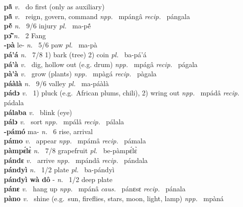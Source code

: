\noindent
{\bfseries pã̂}  {\itshape v.~} do first (only as auxiliary)    \\ 
{\bfseries pã̂}  {\itshape v.~} reign, govern, command   {\itshape npp.~} mpángâ {\itshape recip.~} pángala  \\ 
{\bfseries pẽ́}  {\itshape n.~} 9/6 injury {\itshape pl.~} ma-pẽ́    \\ 
{\bfseries pɔ̃̂}  {\itshape n.~} 2 Fang    \\ 
{\bfseries -pà} le- {\itshape n.~} 5/6 paw {\itshape pl.~} ma-pà    \\ 
{\bfseries pá'á}  {\itshape n.~} 7/8 1) bark (tree) 2) coin {\itshape pl.~} ba-pá'á    \\ 
{\bfseries pá'à}  {\itshape v.~} dig, hollow out (e.g. drum)   {\itshape npp.~} mpágâ {\itshape recip.~} págala  \\ 
{\bfseries pà'à}  {\itshape v.~} grow (plants)   {\itshape npp.~} mpàgá {\itshape recip.~} pàgala  \\ 
{\bfseries páàlà}  {\itshape n.~} 9/6 valley {\itshape pl.~} ma-páàlà    \\ 
{\bfseries pádɔ}  {\itshape v.~} 1) pluck (e.g.\ African plums, chili), 2) wring out   {\itshape npp.~} mpádâ {\itshape recip.~} pádala  \\ 
{\bfseries pálaba}  {\itshape v.~} blink (eye)    \\ 
{\bfseries pálɔ}  {\itshape v.~} sort   {\itshape npp.~} mpálâ {\itshape recip.~} pálala  \\ 
{\bfseries -pámó} ma- {\itshape n.~} 6 rise, arrival    \\ 
{\bfseries pámo}  {\itshape v.~} appear   {\itshape npp.~} mpámâ {\itshape recip.~} pámala  \\ 
{\bfseries pàmpɛ́lɛ̀}  {\itshape n.~} 7/8 grapefruit {\itshape pl.~} be-pàmpɛ́lɛ̀    \\ 
{\bfseries pándɛ}  {\itshape v.~} arrive   {\itshape npp.~} mpándâ {\itshape recip.~} pándala  \\ 
{\bfseries pándyì}  {\itshape n.~} 1/2 plate {\itshape pl.~} ba-pándyì    \\ 
{\bfseries pándyì wà dô} - {\itshape  n.~} 1/2 deep plate    \\ 
{\bfseries pánɛ}  {\itshape v.~} hang up   {\itshape npp.~} mpánâ {\itshape caus.~} pánɛsɛ {\itshape recip.~} pánala  \\ 
{\bfseries pàno}  {\itshape v.~} shine (e.g.\ sun, fireflies, stars, moon, light, lamp)   {\itshape npp.~} mpàná  \\ 
